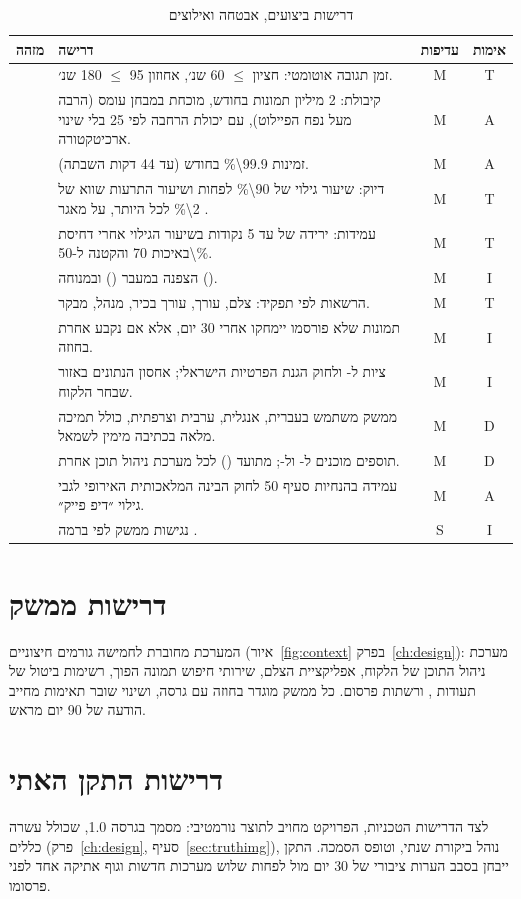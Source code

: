 \begin{table}[!htb]\centering
\caption{דרישות ביצועים, אבטחה ואילוצים}\label{tab:nfr}
\small
\begin{tabularx}{\linewidth}{@{}l Y c c@{}}
\toprule
\textbf{מזהה} & \textbf{דרישה} & \textbf{עדיפות} & \textbf{אימות} \\
\midrule
{} & זמן תגובה אוטומטי: חציון $\leq$ \num{60} שנ׳, אחוזון \num{95} $\leq$ \num{180} שנ׳. & M & T \\
 & קיבולת: \num{2} מיליון תמונות בחודש, מוכחת במבחן עומס (הרבה מעל נפח הפיילוט), עם יכולת הרחבה לפי \num{25} בלי שינוי ארכיטקטורה. & M & A \\
 & זמינות \num{99.9\%} בחודש (עד \num{44} דקות השבתה). & M & A \\
 & דיוק: שיעור גילוי של \num{90\%} לפחות ושיעור התרעות שווא של \num{2\%} לכל היותר, על מאגר . & M & T \\
 & עמידות: ירידה של עד \num{5} נקודות בשיעור הגילוי אחרי דחיסת  באיכות \num{70} והקטנה ל-\num{50\%}. & M & T \\
\midrule
{} & הצפנה במעבר () ובמנוחה (). & M & I \\
 & הרשאות לפי תפקיד: צלם, עורך, עורך בכיר, מנהל, מבקר. & M & T \\
 & תמונות שלא פורסמו יימחקו אחרי \num{30} יום, אלא אם נקבע אחרת בחוזה. & M & I \\
 & ציות ל- ולחוק הגנת הפרטיות הישראלי; אחסון הנתונים באזור שבחר הלקוח. & M & I \\
\midrule
{} & ממשק משתמש בעברית, אנגלית, ערבית וצרפתית, כולל תמיכה מלאה בכתיבה מימין לשמאל. & M & D \\
 & תוספים מוכנים ל- ול-;  מתועד () לכל מערכת ניהול תוכן אחרת. & M & D \\
 & עמידה בהנחיות סעיף \num{50} לחוק הבינה המלאכותית האירופי לגבי גילוי ״דיפ פייק״. & M & A \\
 & נגישות ממשק לפי  ברמה . & S & I \\
\bottomrule
\end{tabularx}
\end{table}

\section{דרישות ממשק}
המערכת מחוברת לחמישה גורמים חיצוניים (איור~\ref{fig:context} בפרק~\ref{ch:design}): מערכת ניהול התוכן של הלקוח, אפליקציית הצלם, שירותי חיפוש תמונה הפוך, רשימות ביטול של תעודות , ורשתות פרסום. כל ממשק מוגדר בחוזה  עם גרסה, ושינוי שובר תאימות מחייב הודעה של \num{90} יום מראש.

\section{דרישות התקן האתי}
לצד הדרישות הטכניות, הפרויקט מחויב לתוצר נורמטיבי: מסמך  בגרסה \num{1.0}, שכולל עשרה כללים (פרק~\ref{ch:design}, סעיף~\ref{sec:truthimg}), נוהל ביקורת שנתי, וטופס הסמכה. התקן ייבחן בסבב הערות ציבורי של \num{30} יום מול לפחות שלוש מערכות חדשות וגוף אתיקה אחד לפני פרסומו.
